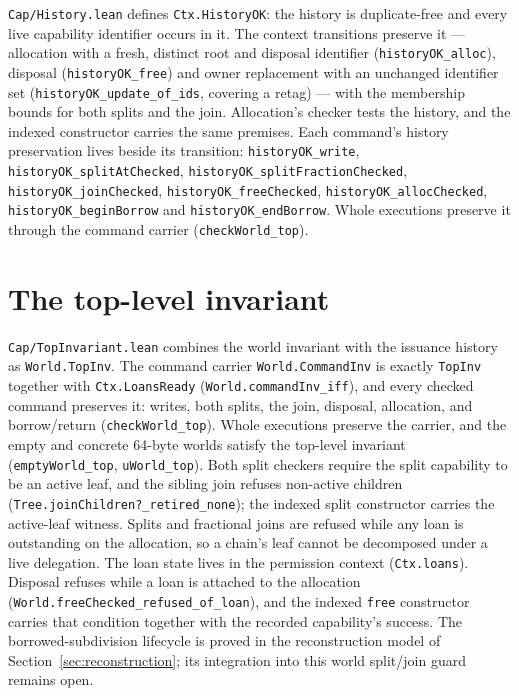 \documentclass[10pt,a4paper]{article}
\newcommand{\file}[1]{\texttt{\small #1}}
\begin{document}
\file{Cap/History.lean} defines \texttt{Ctx.HistoryOK}: the history is
duplicate-free and every live capability identifier occurs in it. The context
transitions preserve it --- allocation with a fresh, distinct root and disposal
identifier (\texttt{historyOK\_alloc}), disposal (\texttt{historyOK\_free}) and
owner replacement with an unchanged identifier set
(\texttt{historyOK\_update\_of\_ids}, covering a retag) --- with the membership
bounds for both splits and the join. Allocation's checker tests the history, and
the indexed constructor carries the same premises. Each command's history
preservation lives beside its transition: \texttt{historyOK\_write},
\texttt{historyOK\_splitAtChecked}, \texttt{historyOK\_splitFractionChecked},
\texttt{historyOK\_joinChecked}, \texttt{historyOK\_freeChecked},
\texttt{historyOK\_allocChecked}, \texttt{historyOK\_beginBorrow} and
\texttt{historyOK\_endBorrow}. Whole executions preserve it through the command
carrier (\texttt{checkWorld\_top}).

\section{The top-level invariant}

\file{Cap/TopInvariant.lean} combines the world invariant with the issuance
history as \texttt{World.TopInv}. The command carrier
\texttt{World.CommandInv} is exactly \texttt{TopInv} together with
\texttt{Ctx.LoansReady} (\texttt{World.commandInv\_iff}), and every checked
command preserves it: writes, both splits, the join, disposal, allocation, and
borrow/return (\texttt{checkWorld\_top}). Whole executions preserve the carrier,
and the empty and concrete 64-byte worlds satisfy the top-level invariant
(\texttt{emptyWorld\_top}, \texttt{uWorld\_top}). Both split checkers require the split capability to be an active leaf, and the
sibling join refuses non-active children
(\texttt{Tree.joinChildren?\_retired\_none}); the indexed split constructor
carries the active-leaf witness. Splits and fractional joins are refused while
any loan is outstanding on the allocation, so a chain's leaf cannot be
decomposed under a live delegation. The loan state lives in the permission
context (\texttt{Ctx.loans}). Disposal refuses while a loan is attached to the
allocation (\texttt{World.freeChecked\_refused\_of\_loan}), and the indexed
\texttt{free} constructor carries that condition together with the recorded
capability's success. The borrowed-subdivision lifecycle is proved in the
reconstruction model of Section~\ref{sec:reconstruction}; its
integration into this world split/join guard remains open.
\end{document}
